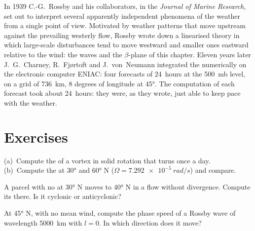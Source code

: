 \begin{history}
In 1939 C.-G.~Rossby and his collaborators, in the \emph{Journal of Marine
Research}, set out to interpret several apparently independent phenomena
of the weather from a single point of view. Motivated by weather patterns
that move upstream against the prevailing westerly flow, Rossby wrote down
a linearised theory in which large-scale disturbances tend to move westward
and smaller ones eastward relative to the wind: the waves and the
$\beta$-plane of this chapter. Eleven years later J.~G.~Charney,
R.~Fjørtoft and J.~von~Neumann integrated the 
numerically on the electronic computer ENIAC: four forecasts of 24~hours at
the \qty{500}{mb} level, on a grid of \qty{736}{km}, 8 degrees of longitude
at \ang{45}. The computation of each forecast took about 24~hours: they
were, as they wrote, just able to keep pace with the weather.
\end{history}

\section{Exercises}

\begin{exercise}[$\star$]\label{exo:b3:atmospheric-dynamics:1}
(a)~Compute the  of a vortex in solid rotation that turns
once a day. (b)~Compute the  at \ang{30} and \ang{60} N
($\Omega = \qty{7.292e-5}{rad/s}$) and compare.
\end{exercise}

\begin{exercise}[$\star$]\label{exo:b3:atmospheric-dynamics:2}
A parcel with no  at \ang{30} N moves to \ang{40} N in a
flow without divergence. Compute its  there. Is it
cyclonic or anticyclonic?
\end{exercise}

\begin{exercise}[$\star$]\label{exo:b3:atmospheric-dynamics:3}
At \ang{45} N, with no mean wind, compute the phase speed of a Rossby wave
of wavelength \qty{5000}{km} with $l = 0$. In which direction does it move?
\end{exercise}

